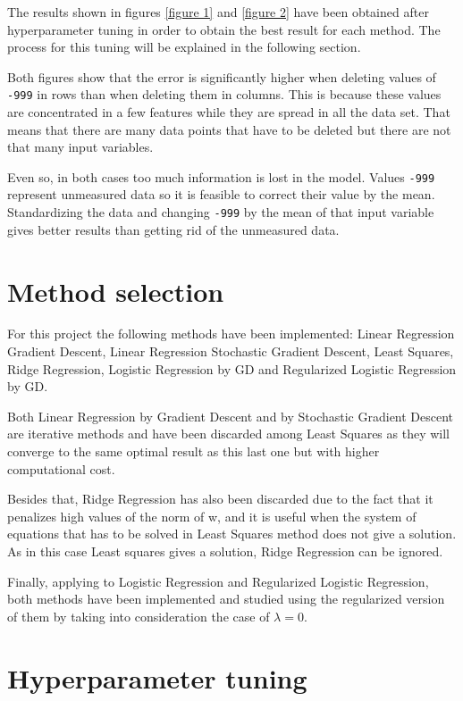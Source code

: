 \documentclass[10pt,conference]{IEEEtran}
\begin{document}
The results shown in figures \ref{figure 1} and \ref{figure 2} have been obtained after hyperparameter tuning in order to obtain the best result for each method. The process for this tuning will be explained in the following section. 

Both figures show that the error is significantly higher when deleting values of \verb|-999| in rows than when deleting them in columns. This is because these values are concentrated in a few features while they are spread in all the data set. That means that there are many data points that have to be deleted but there are not that many input variables. 

Even so, in both cases too much information is lost in the model. Values \verb|-999| represent unmeasured data so it is feasible to correct their value by the mean. Standardizing the data and changing \verb|-999| by the mean of that input variable gives better results than getting rid of the unmeasured data.

\section{Method selection}

For this project the following methods have been implemented: Linear Regression Gradient Descent, Linear Regression Stochastic Gradient Descent, Least Squares, Ridge Regression, Logistic Regression by GD and Regularized Logistic Regression by GD.

Both Linear Regression by Gradient Descent and by Stochastic Gradient Descent are iterative methods and have been discarded among Least Squares as they will converge to the same optimal result as this last one but with higher computational cost. 

Besides that, Ridge Regression has also been discarded due to the fact that it penalizes high values of the norm of w, and it is useful when the system of equations that has to be solved in Least Squares method does not give a solution. As in this case Least squares gives a solution, Ridge Regression can be ignored. 

Finally, applying to Logistic Regression and Regularized Logistic Regression, both methods have been implemented and studied using the regularized version of them by taking into consideration the case of $\lambda=0$. 

\section{Hyperparameter tuning}
\end{document}
